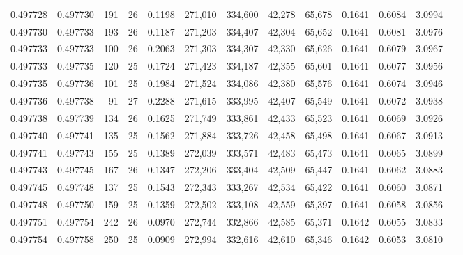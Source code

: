 \begin{tabular}{rrrrrrrrrrrrr}
0.497728 & 0.497730 & 191 &  26 &                                     0.1198 & 271,010 & 334,600 &  42,278 &  65,678 & 0.1641 & 0.6084 & 3.0994 \\
0.497730 & 0.497733 & 193 &  26 &                                     0.1187 & 271,203 & 334,407 &  42,304 &  65,652 & 0.1641 & 0.6081 & 3.0976 \\
0.497733 & 0.497733 & 100 &  26 &                                     0.2063 & 271,303 & 334,307 &  42,330 &  65,626 & 0.1641 & 0.6079 & 3.0967 \\
0.497733 & 0.497735 & 120 &  25 &                                     0.1724 & 271,423 & 334,187 &  42,355 &  65,601 & 0.1641 & 0.6077 & 3.0956 \\
0.497735 & 0.497736 & 101 &  25 &                                     0.1984 & 271,524 & 334,086 &  42,380 &  65,576 & 0.1641 & 0.6074 & 3.0946 \\
0.497736 & 0.497738 &  91 &  27 &                                     0.2288 & 271,615 & 333,995 &  42,407 &  65,549 & 0.1641 & 0.6072 & 3.0938 \\
0.497738 & 0.497739 & 134 &  26 &                                     0.1625 & 271,749 & 333,861 &  42,433 &  65,523 & 0.1641 & 0.6069 & 3.0926 \\
0.497740 & 0.497741 & 135 &  25 &                                     0.1562 & 271,884 & 333,726 &  42,458 &  65,498 & 0.1641 & 0.6067 & 3.0913 \\
0.497741 & 0.497743 & 155 &  25 &                                     0.1389 & 272,039 & 333,571 &  42,483 &  65,473 & 0.1641 & 0.6065 & 3.0899 \\
0.497743 & 0.497745 & 167 &  26 &                                     0.1347 & 272,206 & 333,404 &  42,509 &  65,447 & 0.1641 & 0.6062 & 3.0883 \\
0.497745 & 0.497748 & 137 &  25 &                                     0.1543 & 272,343 & 333,267 &  42,534 &  65,422 & 0.1641 & 0.6060 & 3.0871 \\
0.497748 & 0.497750 & 159 &  25 &                                     0.1359 & 272,502 & 333,108 &  42,559 &  65,397 & 0.1641 & 0.6058 & 3.0856 \\
0.497751 & 0.497754 & 242 &  26 &                                     0.0970 & 272,744 & 332,866 &  42,585 &  65,371 & 0.1642 & 0.6055 & 3.0833 \\
0.497754 & 0.497758 & 250 &  25 &                                     0.0909 & 272,994 & 332,616 &  42,610 &  65,346 & 0.1642 & 0.6053 & 3.0810 \\

\end{tabular}
